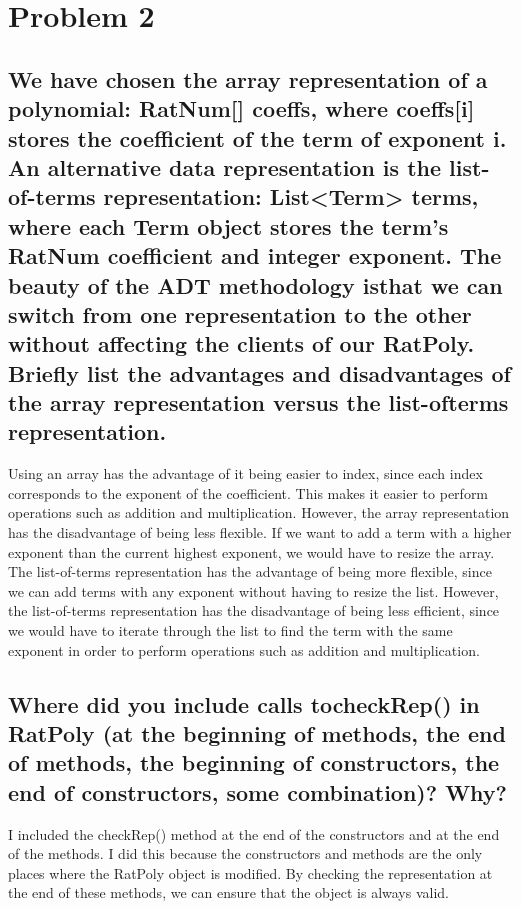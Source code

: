 \documentclass[11pt]{article}
\begin{document}
\section{Problem 2}

\subsection{We have chosen the array representation of a polynomial: RatNum[] coeffs, where coeffs[i]
stores the coefficient of the term of exponent i. An alternative data representation is the
list-of-terms representation: List<Term> terms, where each Term object stores the term’s
RatNum coefficient and integer exponent. The beauty of the ADT methodology isthat we
can switch from one representation to the other without affecting the clients of our RatPoly.
Briefly list the advantages and disadvantages of the array representation versus the list-ofterms representation.
}
Using an array has the advantage of it being easier to index, since each index corresponds to the exponent of the coefficient. This makes it easier to perform operations such as addition and multiplication. However, the array representation has the disadvantage of being less flexible. If we want to add a term with a higher exponent than the current highest exponent, we would have to resize the array. The list-of-terms representation has the advantage of being more flexible, since we can add terms with any exponent without having to resize the list. However, the list-of-terms representation has the disadvantage of being less efficient, since we would have to iterate through the list to find the term with the same exponent in order to perform operations such as addition and multiplication.
\subsection{Where did you include calls tocheckRep() in RatPoly (at the beginning of methods, the
end of methods, the beginning of constructors, the end of constructors, some combination)?
Why?}
I included the checkRep() method at the end of the constructors and at the end of the methods. I did this because the constructors and methods are the only places where the RatPoly object is modified. By checking the representation at the end of these methods, we can ensure that the object is always valid.
\end{document}

